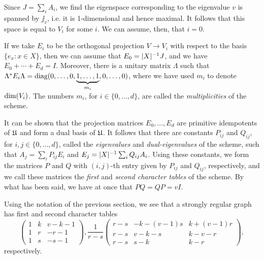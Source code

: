 \documentclass[../../../main]{subfiles}
\begin{document}
 Since $J=\sum_i A_i$, we find the eigenspace corresponding to the eigenvalue $v$ is spanned by $\jj_v$, i.e. it is 1-dimensional and hence maximal. It follows that this space is equal to $V_i$ for some $i$. We can assume, then, that $i=0$.
 
 If we take $E_i$ to be the orthogonal projection $V \rightarrow V_i$ with respect to the basis $\{e_x : x \in X\}$, then we can assume that $E_0=|X|^{-1}J$, and we have $E_0 + \cdots + E_d = I$. Moreover, there is a unitary matrix $\Lambda$ such that $\Lambda^* E_i \Lambda = \text{diag}(0,\dots,0,\underbrace{1,\dots,1}_{m_i},0,\dots,0)$, where we have used $m_i$ to denote $\text{dim}(V_i)$. The numbers $m_i$, for $i \in \{0, \dots, d\}$, are called the {\it multiplicities} of the scheme.
 
 It can be shown \cite[see][Theorem 3.1]{bannaialgebraic} that the projection matrices $E_0, \dots, E_d$ are primitive idempotents of $\mathfrak{U}$ and form a dual basis of $\mathfrak{U}$. It follows that there are constants $P_{ij}$ and $Q_{ij}$, for $i,j \in \{0, \dots, d\}$, called the {\it eigenvalues} and {\it dual-eigenvalues} of the scheme, such that $A_j=\sum_i P_{ij}E_i$ and $E_j=|X|^{-1}\sum_i Q_{ij}A_i$. Using these constants, we form the matrices $P$ and $Q$ with $(i,j)$-th entry given by $P_{ij}$ and $Q_{ij}$, respectively, and we call these matrices the {\it first} and {\it second character tables} of the scheme. By what has been said, we have at once that $PQ=QP=vI$.
 
 \begin{ex}
  Using the notation of the previous section, we see that a strongly regular graph has first and second character tables
  \begin{equation}
   \begin{pmatrix}
      1 & k & v-k-1 \\
      1 & r & -r-1 \\
      1 & s & -s-1
     \end{pmatrix},
   \frac{1}{r-s}\begin{pmatrix}
      r-s & -k-(v-1)s & k+(v-1)r \\
      r-s & v-k-s & k-v-r \\
      r-s & s-k & k-r
     \end{pmatrix},
  \end{equation}
  respectively.
 \end{ex}
 
\end{document}
